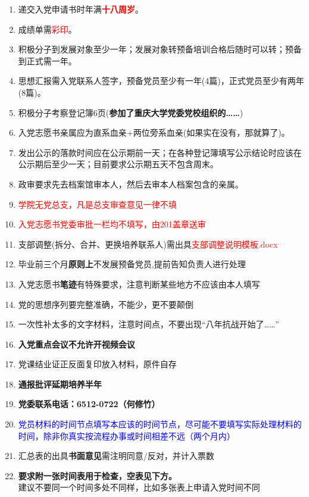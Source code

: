 \documentclass[fontset=windows]{ctexart}
\begin{document}
\begin{tcolorbox}
    \begin{enumerate}
        \item 递交入党申请书时年满\textbf{\textcolor{red}{十八周岁}}。\label{enterdate}
        \item 成绩单需{\Large \textcolor{red}{彩印}}。
        \item 积极分子到发展对象至少一年；发展对象转预备培训合格后随时可以转；预备到正式需一年。
        \item 思想汇报需入党联系人签字，预备党员至少有一年(4篇)，正式党员至少有两年(8篇)。
        \item 积极分子考察登记簿6页{\Large (\textbf{参加了重庆大学党委党校组织的……})}
        \item 入党志愿书亲属应为直系血亲+两位旁系血亲(如果实在没有，那就算了)。
        \item 发出公示的落款时间应在公示期前一天；在各种登记簿填写公示结论时应该在公示期后至少一天；目前要求公示期五天不包含周末。
        \item 政审要求先去档案馆审本人，然后去审本人档案包含的亲属。
        \item \textcolor{red}{学院无党总支，凡是总支审查意见一律不填}
        \item \textcolor{red}{\huge 入党志愿书党委审批一栏均不填写，由201盖章送审} \label{very important point}
        \item 支部调整(拆分、合并、更换培养联系人)需出具\textcolor{red}{支部调整说明模板.docx}
        \item 毕业前三个月\textbf{原则上}不发展预备党员,提前告知负责人进行处理
        \item 入党志愿书\textbf{笔迹}有特殊要求，注意判断某些地方不应该由本人填写\label{biji}
        \item 党的思想序列要完整准确，不能少，更不要颠倒
        \item 一次性补太多的文字材料，注意时间点，不要出现“八年抗战开始了……”
        \item \textbf{入党重点会议不允许开视频会议}
        \item 党课结业证正反面复印放入材料，原件自存
        \item \textbf{通报批评延期培养半年}
        \item \textbf{党委联系电话：6512-0722（何修竹）}
        \item \textcolor{blue}{党员材料的时间节点填写本应该的时间节点，尽可能不要填写实际处理材料的时间，除非你真实按流程办事或时间相差不远（两个月内）}
        \item 汇总表的出具\textbf{书面意见}需注明同意/反对，并计入票数
        \item \textbf{\huge 要求附一张时间表用于检查，空表见下方。}\\建议不要同一个时间多处不同样，比如多张表上申请入党时间不同
    \end{enumerate}
\end{tcolorbox}
\end{document}
